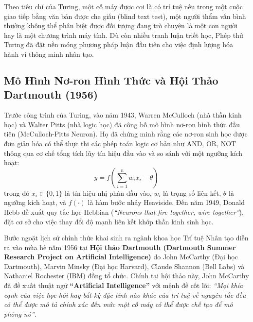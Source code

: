 \documentclass[12pt,a4paper]{report}
\begin{document}
Theo tiêu chí của Turing, một cỗ máy được coi là có trí tuệ nếu trong một cuộc giao tiếp bằng văn bản được che giấu (blind text test), một người thẩm vấn bình thường không thể phân biệt được đối tượng đang trò chuyện là một con người hay là một chương trình máy tính. Dù còn nhiều tranh luận triết học, Phép thử Turing đã đặt nền móng phương pháp luận đầu tiên cho việc định lượng hóa hành vi thông minh nhân tạo.

\subsection{Mô Hình Nơ-ron Hình Thức và Hội Thảo Dartmouth (1956)}
Trước công trình của Turing, vào năm 1943, Warren McCulloch (nhà thần kinh học) và Walter Pitts (nhà logic học) đã công bố mô hình nơ-ron hình thức đầu tiên (McCulloch-Pitts Neuron). Họ đã chứng minh rằng các nơ-ron sinh học được đơn giản hóa có thể thực thi các phép toán logic cơ bản như AND, OR, NOT thông qua cơ chế tổng tích lũy tín hiệu đầu vào và so sánh với một ngưỡng kích hoạt:
\begin{equation}
y = f\left(\sum_{i=1}^n w_i x_i - \theta\right)
\end{equation}
trong đó $x_i \in \{0, 1\}$ là tín hiệu nhị phân đầu vào, $w_i$ là trọng số liên kết, $\theta$ là ngưỡng kích hoạt, và $f(\cdot)$ là hàm bước nhảy Heaviside. Đến năm 1949, Donald Hebb đề xuất quy tắc học Hebbian (\textit{“Neurons that fire together, wire together”}), đặt cơ sở cho việc thay đổi độ mạnh liên kết khớp thần kinh sinh học.

Bước ngoặt lịch sử chính thức khai sinh ra ngành khoa học Trí tuệ Nhân tạo diễn ra vào mùa hè năm 1956 tại \textbf{Hội thảo Dartmouth (Dartmouth Summer Research Project on Artificial Intelligence)} do John McCarthy (Đại học Dartmouth), Marvin Minsky (Đại học Harvard), Claude Shannon (Bell Labs) và Nathaniel Rochester (IBM) đồng tổ chức. Chính tại hội thảo này, John McCarthy đã đề xuất thuật ngữ \textbf{“Artificial Intelligence”} với mệnh đề cốt lõi: \textit{“Mọi khía cạnh của việc học hỏi hay bất kỳ đặc tính nào khác của trí tuệ về nguyên tắc đều có thể được mô tả chính xác đến mức một cỗ máy có thể được chế tạo để mô phỏng nó”}.
\end{document}
